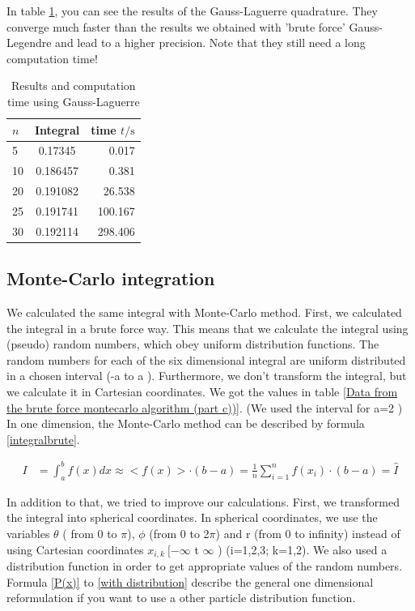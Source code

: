 \documentclass[10pt,a4paper]{article}
\begin{document}
In table \ref{results_lag}, you can see the results of the Gauss-Laguerre quadrature. They converge much faster than the results we obtained with 'brute force' Gauss-Legendre and lead to a higher precision. Note that they still need a long computation time!

\begin{table}[h]
	\caption{Results and computation time using Gauss-Laguerre\label{results_lag}}
	\centering
	\begin{tabular}{lcr}
		$n$	&	Integral	&	time $t/\mathrm{s}$	\\\hline
		5	&	0.17345	&	0.017	\\
		10	&	0.186457	&	0.381	\\
		20	&	0.191082	&	26.538	\\
		25	&	0.191741	&	100.167	\\
		30	&	0.192114	&	298.406	
	\end{tabular}
\end{table}

\subsection{Monte-Carlo integration}

We calculated the same integral with Monte-Carlo method. First, we calculated the integral in a brute force way. This means that we calculate the integral using (pseudo) random numbers, which obey uniform distribution functions. The random numbers for each of the six dimensional integral are uniform distributed in a chosen interval (-a to a ). Furthermore, we don't transform the integral, but we calculate it in Cartesian coordinates. We got the values in table \ref{Data from the brute force montecarlo algorithm (part c))}. (We used the interval for a=2 ) In one dimension, the Monte-Carlo method can be described by formula \ref{integralbrute}. 

\begin{align}
I &= \int_{a}^{b} f(x) dx \approx < f(x) > \cdot (b-a) = \frac{1}{n} \sum_{i=1}^{n} f(x_i) \cdot (b-a) = \hat{I} \label{integralbrute}
\end{align}
 
In addition to that, we tried to improve our calculations. First, we transformed the integral into spherical coordinates. In spherical coordinates, we use the variables $\theta$ ( from 0 to $\pi$), $\phi$ (from 0 to 2$\pi$) and r (from 0 to infinity) instead of using Cartesian coordinates $x_{i,k} \ [-\infty$ t $\infty$ ) (i=1,2,3; k=1,2). We also used a distribution function in order to get appropriate values of the random numbers.  Formula \ref{P(x)} to \ref{with distribution} describe the general one dimensional reformulation if you want to use a other particle distribution function. 
\end{document}
